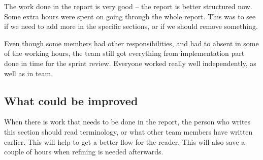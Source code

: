 The work done in the report is very good -- the report is better structured now.
Some extra hours were spent on going through the whole report. 
This was to see if we need to add more in the specific sections, or if we should remove something.  

Even though some members had other responsibilities, and had to absent in some of the working hours, the team still got everything from implementation part done in time for the sprint review. Everyone worked really well independently, as well as in team. 



\subsection{What could be improved}

When there is work that needs to be done in the report, the person who writes this section should read terminology, or what other team members have written earlier. 
This will help to get a better flow for the reader.
This will also save a couple of hours when refining is needed afterwards. 
